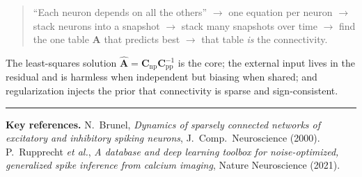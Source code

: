 \documentclass[11pt,a4paper]{article}
\newcommand{\Amat}{\mathbf{A}}
\begin{document}
\begin{quote}
``Each neuron depends on all the others'' $\to$ one equation per neuron $\to$
stack neurons into a snapshot $\to$ stack many snapshots over time $\to$ find the
one table $\Amat$ that predicts best $\to$ that table \emph{is} the connectivity.
\end{quote}

The least-squares solution $\widehat{\Amat}=\mathbf{C}_{\text{np}}
\mathbf{C}_{\text{pp}}^{-1}$ is the core; the external input lives in the
residual and is harmless when independent but biasing when shared; and
regularization injects the prior that connectivity is sparse and sign-consistent.

\vspace{1em}
\hrule
\vspace{0.6em}
\small
\noindent\textbf{Key references.}
N.~Brunel, \emph{Dynamics of sparsely connected networks of excitatory and
inhibitory spiking neurons}, J.\ Comp.\ Neuroscience (2000).\;
P.~Rupprecht \emph{et al.}, \emph{A database and deep learning toolbox for
noise-optimized, generalized spike inference from calcium imaging}, Nature
Neuroscience (2021).
\end{document}
